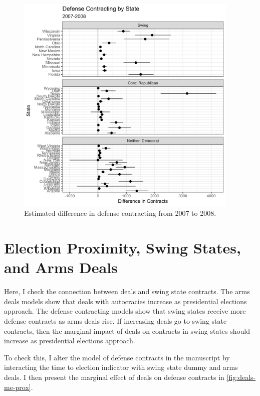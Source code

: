 \documentclass[12pt]{article}
\begin{document}
\begin{figure}[htpb]
	\centering
		\includegraphics[width=0.95\textwidth]{est-08-cycle-facet.png}
	\caption{Estimated difference in defense contracting from 2007 to 2008.}
	\label{fig:est-08-cycle-facet}
\end{figure}

\newpage 

\section{Election Proximity, Swing States, and Arms Deals}

Here, I check the connection between deals and swing state contracts. 
The arms deals models show that deals with autocracies increase as presidential elections approach. 
The defense contracting models show that swing states receive more defense contracts as arms deals rise.
If increasing deals go to swing state contracts, then the marginal impact of deals on contracts in swing states should increase as presidential elections approach. 


To check this, I alter the model of defense contracts in the manuscript by interacting the time to election indicator with swing state dummy and arms deals. 
I then present the marginal effect of deals on defense contracts in \autoref{fig:deals-me-prox}. 
\end{document}
